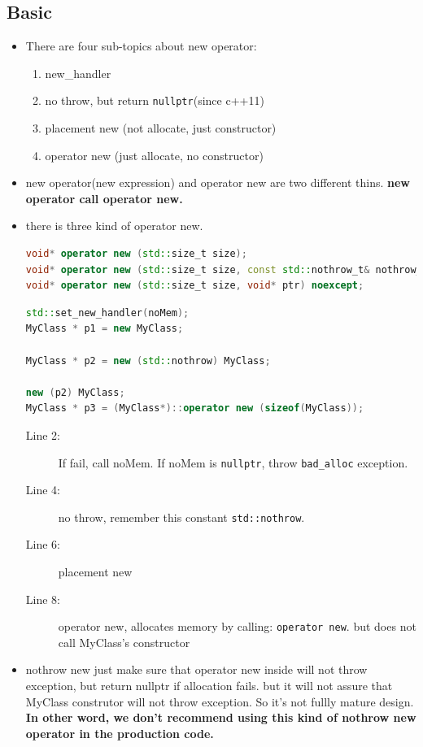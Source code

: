\documentclass[a4paper,11pt,twoside]{book}
\begin{document}
\subsection{Basic}
\begin{itemize}
	\item There are four sub-topics about new operator:
	\begin{enumerate}
		\item new\_handler
		\item no throw, but return \texttt{nullptr}(since c++11)
		\item placement new (not allocate, just constructor)
		\item operator new (just allocate, no constructor)
	\end{enumerate}
	
	\item new operator(new expression) and operator new are two different thins. \textbf{new operator call operator new.} 
	
	\item there is three kind of operator new.
\begin{lstlisting}[frame=single, language=c++]
void* operator new (std::size_t size);
void* operator new (std::size_t size, const std::nothrow_t& nothrow_value) noexcept;
void* operator new (std::size_t size, void* ptr) noexcept;
\end{lstlisting}
	
\begin{lstlisting}[frame=single, language=c++]
std::set_new_handler(noMem);
MyClass * p1 = new MyClass;  

MyClass * p2 = new (std::nothrow) MyClass; 

new (p2) MyClass;  
MyClass * p3 = (MyClass*)::operator new (sizeof(MyClass));
\end{lstlisting}
\begin{description}
	\item[Line 2:] If fail, call noMem. If noMem is \texttt{nullptr}, throw \texttt{bad\_alloc} exception.
	\item[Line 4:] no throw, remember this constant \texttt{std::nothrow}.
	\item[Line 6:] placement new
	\item[Line 8:] operator new, allocates memory by calling: \texttt{operator new}. but does not call MyClass's constructor
\end{description}	

\item nothrow new just make sure that operator new inside will not throw exception, but return nullptr if allocation fails. but it will not assure that MyClass construtor will not throw exception. So it's not fullly mature design. \textbf{In other word, we don't recommend using this kind of nothrow new operator in the production code.}


\end{itemize}
\end{document}
